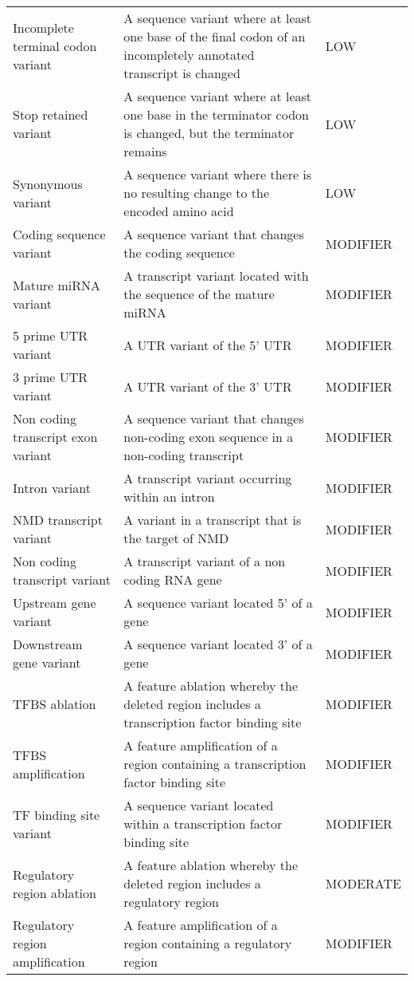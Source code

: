 \documentclass[12pt,twoside]{reedthesis}
\theoremstyle{definition}
\theoremstyle{definition}
\theoremstyle{remark}
\begin{document}
\begin{table}
\begin{tabular}[t]{lll}
  Incomplete terminal codon variant & A sequence variant where at least one base of the final codon of an incompletely annotated transcript is changed & LOW\\
  Stop retained variant & A sequence variant where at least one base in the terminator codon is changed, but the terminator remains & LOW\\
  \addlinespace
  Synonymous variant & A sequence variant where there is no resulting change to the encoded amino acid & LOW\\
  Coding sequence variant & A sequence variant that changes the coding sequence & MODIFIER\\
  Mature miRNA variant & A transcript variant located with the sequence of the mature miRNA & MODIFIER\\
  5 prime UTR variant & A UTR variant of the 5' UTR & MODIFIER\\
  3 prime UTR variant & A UTR variant of the 3' UTR & MODIFIER\\
  \addlinespace
  Non coding transcript exon variant & A sequence variant that changes non-coding exon sequence in a non-coding transcript & MODIFIER\\
  Intron variant & A transcript variant occurring within an intron & MODIFIER\\
  NMD transcript variant & A variant in a transcript that is the target of NMD & MODIFIER\\
  Non coding transcript variant & A transcript variant of a non coding RNA gene & MODIFIER\\
  Upstream gene variant & A sequence variant located 5' of a gene & MODIFIER\\
  \addlinespace
  Downstream gene variant & A sequence variant located 3' of a gene & MODIFIER\\
  TFBS ablation & A feature ablation whereby the deleted region includes a transcription factor binding site & MODIFIER\\
  TFBS amplification & A feature amplification of a region containing a transcription factor binding site & MODIFIER\\
  TF binding site variant & A sequence variant located within a transcription factor binding site & MODIFIER\\
  Regulatory region ablation & A feature ablation whereby the deleted region includes a regulatory region & MODERATE\\
  \addlinespace
  Regulatory region amplification & A feature amplification of a region containing a regulatory region & MODIFIER\\

\end{tabular}
\end{table}
\end{document}
